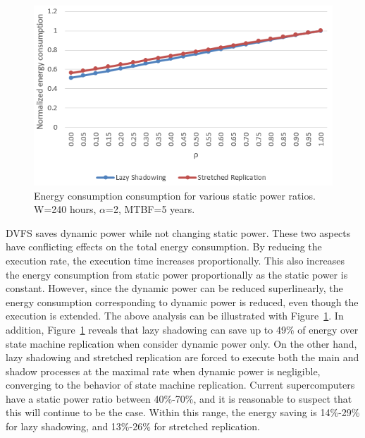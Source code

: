 \begin{figure}[!t]	
	\begin{center}
		\includegraphics[width=\columnwidth]{figures/rho.png}
	\end{center}
	\caption{Energy consumption consumption for various static power ratios. W=240 hours, $\alpha$=2, MTBF=5 years.}
	\label{fig:rho}
\end{figure}

DVFS saves dynamic power while not changing static power. These two aspects have conflicting effects on the total energy consumption. By reducing the execution rate, the execution time increases proportionally. This also increases the energy consumption from static power proportionally as the static power is constant. However, since the dynamic power can be reduced superlinearly, the energy consumption corresponding to dynamic power is reduced, even though the execution is extended. The above analysis can be illustrated with Figure~\ref{fig:rho}. In addition, Figure~\ref{fig:rho} reveals that lazy shadowing can save up to 49\% of energy over state machine replication when consider dynamic power only. On the other hand, lazy shadowing and stretched replication are forced to execute both the main and shadow processes at the maximal rate when dynamic power is negligible, converging to the behavior of state machine replication. Current supercomputers have a static power ratio between 40\%-70\%, and it is reasonable to suspect that this will continue to be the case. Within this range, the energy saving is 14\%-29\% for lazy shadowing, and 13\%-26\% for stretched replication.


